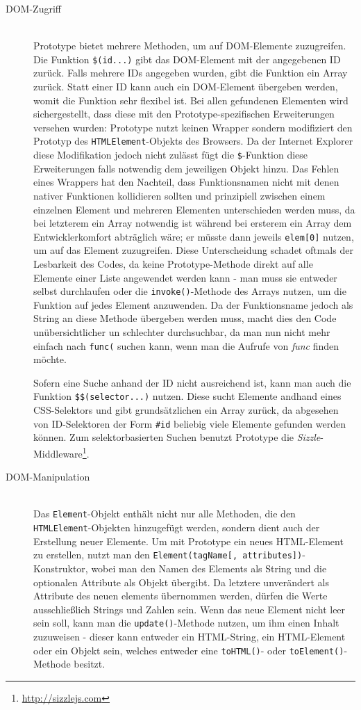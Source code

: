 \begin{description}
\item[DOM-Zugriff] \hfill \\
Prototype bietet mehrere Methoden, um auf DOM-Elemente zuzugreifen. Die Funktion
\lstinline{$(id...)} gibt das DOM-Element mit der angegebenen ID zurück. Falls mehrere IDs angegeben
wurden, gibt die Funktion ein Array zurück. Statt einer ID kann auch ein DOM-Element übergeben
werden, womit die Funktion sehr flexibel ist. Bei allen gefundenen Elementen wird sichergestellt,
dass diese mit den Prototype-spezifischen Erweiterungen versehen wurden: Prototype nutzt keinen
Wrapper sondern modifiziert den Prototyp des \lstinline{HTMLElement}-Objekts des Browsers. Da der
Internet Explorer diese Modifikation jedoch nicht zulässt fügt die \lstinline{$}-Funktion diese
Erweiterungen falls notwendig dem jeweiligen Objekt hinzu. Das Fehlen eines Wrappers hat den
Nachteil, dass Funktionsnamen nicht mit denen nativer Funktionen kollidieren sollten und prinzipiell
zwischen einem einzelnen Element und mehreren Elementen unterschieden werden muss, da bei letzterem
ein Array notwendig ist während bei ersterem ein Array dem Entwicklerkomfort abträglich wäre; er
müsste dann jeweils \lstinline{elem[0]} nutzen, um auf das Element zuzugreifen. Diese Unterscheidung
schadet oftmals der Lesbarkeit des Codes, da keine Prototype-Methode direkt auf alle Elemente einer
Liste angewendet werden kann - man muss sie entweder selbst durchlaufen oder die
\lstinline{invoke()}-Methode des Arrays nutzen, um die Funktion auf jedes Element anzuwenden. Da
der Funktionsname jedoch als String an diese Methode übergeben werden muss, macht dies den Code
unübersichtlicher un schlechter durchsuchbar, da man nun nicht mehr einfach nach \lstinline{func(}
suchen kann, wenn man die Aufrufe von \emph{func} finden möchte.

Sofern eine Suche anhand der ID nicht ausreichend ist, kann man auch die Funktion
\lstinline{$$(selector...)} nutzen. Diese sucht Elemente andhand eines CSS-Selektors und gibt
grundsätzlichen ein Array zurück, da abgesehen von ID-Selektoren der Form \lstinline{#id} beliebig
viele Elemente gefunden werden können. Zum selektorbasierten Suchen benutzt Prototype die
\emph{Sizzle}-Middleware\footnote{\href{http://sizzlejs.com}{http://sizzlejs.com}}.

\item[DOM-Manipulation] \hfill \\
Das \lstinline{Element}-Objekt enthält nicht nur alle Methoden, die den
\lstinline{HTMLElement}-Objekten hinzugefügt werden, sondern dient auch der Erstellung neuer
Elemente. Um mit Prototype ein neues HTML-Element zu erstellen, nutzt man den
\lstinline{Element(tagName[, attributes])}-Konstruktor, wobei man den Namen des Elements als String
und die optionalen Attribute als Objekt übergibt. Da letztere unverändert als Attribute des neuen
elements übernommen werden, dürfen die Werte ausschließlich Strings und Zahlen sein. Wenn das neue
Element nicht leer sein soll, kann man die \lstinline{update()}-Methode nutzen, um ihm einen Inhalt
zuzuweisen - dieser kann entweder ein HTML-String, ein HTML-Element oder ein Objekt sein, welches
entweder eine \lstinline{toHTML()}- oder \lstinline{toElement()}-Methode besitzt.


\end{description}
